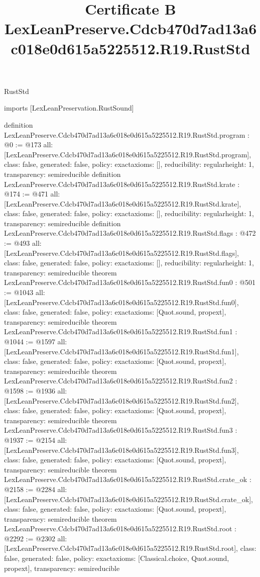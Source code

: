 \begin{lexlean}{RustStd}
\title{Certificate B LexLeanPreserve.Cdcb470d7ad13a6c018e0d615a5225512.R19.RustStd}
\begin{coremodule}
imports [LexLeanPreservation.RustSound]

definition LexLeanPreserve.Cdcb470d7ad13a6c018e0d615a5225512.R19.RustStd.program : @0 := @173 {
  all: [LexLeanPreserve.Cdcb470d7ad13a6c018e0d615a5225512.R19.RustStd.program],
  class: false,
  generated: false,
  policy: exact{axioms: []},
  reducibility: regular{height: 1},
  transparency: semireducible
}
definition LexLeanPreserve.Cdcb470d7ad13a6c018e0d615a5225512.R19.RustStd.krate : @174 := @471 {
  all: [LexLeanPreserve.Cdcb470d7ad13a6c018e0d615a5225512.R19.RustStd.krate],
  class: false,
  generated: false,
  policy: exact{axioms: []},
  reducibility: regular{height: 1},
  transparency: semireducible
}
definition LexLeanPreserve.Cdcb470d7ad13a6c018e0d615a5225512.R19.RustStd.flags : @472 := @493 {
  all: [LexLeanPreserve.Cdcb470d7ad13a6c018e0d615a5225512.R19.RustStd.flags],
  class: false,
  generated: false,
  policy: exact{axioms: []},
  reducibility: regular{height: 1},
  transparency: semireducible
}
theorem LexLeanPreserve.Cdcb470d7ad13a6c018e0d615a5225512.R19.RustStd.fun0 : @501 := @1043 {
  all: [LexLeanPreserve.Cdcb470d7ad13a6c018e0d615a5225512.R19.RustStd.fun0],
  class: false,
  generated: false,
  policy: exact{axioms: [Quot.sound, propext]},
  transparency: semireducible
}
theorem LexLeanPreserve.Cdcb470d7ad13a6c018e0d615a5225512.R19.RustStd.fun1 : @1044 := @1597 {
  all: [LexLeanPreserve.Cdcb470d7ad13a6c018e0d615a5225512.R19.RustStd.fun1],
  class: false,
  generated: false,
  policy: exact{axioms: [Quot.sound, propext]},
  transparency: semireducible
}
theorem LexLeanPreserve.Cdcb470d7ad13a6c018e0d615a5225512.R19.RustStd.fun2 : @1598 := @1936 {
  all: [LexLeanPreserve.Cdcb470d7ad13a6c018e0d615a5225512.R19.RustStd.fun2],
  class: false,
  generated: false,
  policy: exact{axioms: [Quot.sound, propext]},
  transparency: semireducible
}
theorem LexLeanPreserve.Cdcb470d7ad13a6c018e0d615a5225512.R19.RustStd.fun3 : @1937 := @2154 {
  all: [LexLeanPreserve.Cdcb470d7ad13a6c018e0d615a5225512.R19.RustStd.fun3],
  class: false,
  generated: false,
  policy: exact{axioms: [Quot.sound, propext]},
  transparency: semireducible
}
theorem LexLeanPreserve.Cdcb470d7ad13a6c018e0d615a5225512.R19.RustStd.crate_ok : @2158 := @2284 {
  all: [LexLeanPreserve.Cdcb470d7ad13a6c018e0d615a5225512.R19.RustStd.crate_ok],
  class: false,
  generated: false,
  policy: exact{axioms: [Quot.sound, propext]},
  transparency: semireducible
}
theorem LexLeanPreserve.Cdcb470d7ad13a6c018e0d615a5225512.R19.RustStd.root : @2292 := @2302 {
  all: [LexLeanPreserve.Cdcb470d7ad13a6c018e0d615a5225512.R19.RustStd.root],
  class: false,
  generated: false,
  policy: exact{axioms: [Classical.choice, Quot.sound, propext]},
  transparency: semireducible
}


\end{coremodule}
\end{lexlean}
